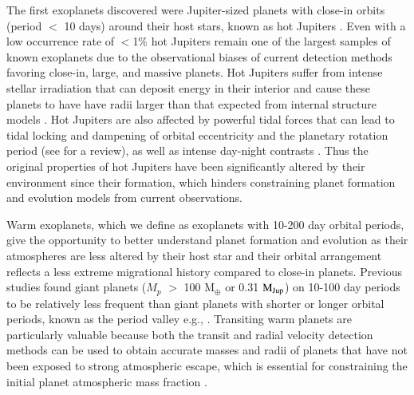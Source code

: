 \documentclass{aa}
\newcommand{\mjup}{\mbox{$\mathrm{M_{\rm Jup}}$}\xspace}
\begin{document}
The first exoplanets discovered were Jupiter-sized planets with close-in orbits (period $<$ 10 days) around their host stars, known as hot Jupiters \citep[e.g.,][]{Mayor1995}. Even with a low occurrence rate of $<$1\% \citep[e.g.,][]{Zhou2019} hot Jupiters remain one of the largest samples of known exoplanets due to the observational biases of current detection methods favoring close-in, large, and massive planets. Hot Jupiters suffer from intense stellar irradiation that can deposit energy in their interior and cause these planets to have have radii larger than that expected from internal structure models \citep[e.g.,][]{Guillot2002}. Hot Jupiters are also affected by powerful tidal forces that can lead to tidal locking and dampening of orbital eccentricity and the planetary rotation period (see \citealt{DawsonJohnson2018} for a review), as well as intense day-night contrasts \citep[e.g.,][]{Knutson2007}. Thus the original properties of hot Jupiters have been significantly altered by their environment since their formation, which hinders constraining planet formation and evolution models from current observations.

Warm exoplanets, which we define as exoplanets with 10-200 day orbital periods, give the opportunity to better understand planet formation and evolution as their atmospheres are less altered by their host star and their orbital arrangement reflects a less extreme migrational history compared to close-in planets. Previous studies found giant planets ($M_{p}$ $>$ 100 M$_{\oplus}$ or 0.31 \mjup) on 10-100 day periods to be relatively less frequent than giant planets with shorter or longer orbital periods, known as the period valley e.g., \citep{Udry2003,Wittenmyer2010}. Transiting warm planets are particularly valuable because both the transit and radial velocity detection methods can be used to obtain accurate masses and radii of planets that have not been exposed to strong atmospheric escape, which is essential for constraining the initial planet atmospheric mass fraction \citep[e.g.,][]{Kubyshkina2019a,Kubyshkina2019b}.
\end{document}

